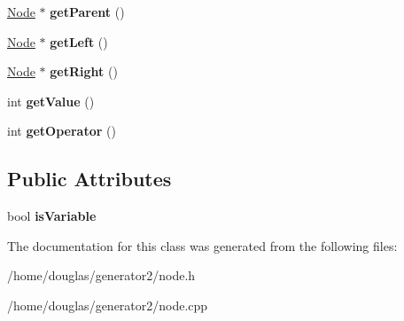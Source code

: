 \begin{DoxyCompactItemize}
\item 
\hyperlink{classNode}{Node} $\ast$ {\bfseries get\+Parent} ()\hypertarget{classNode_a220a8d64cb0df1cce083ed38c1260615}{}\label{classNode_a220a8d64cb0df1cce083ed38c1260615}

\item 
\hyperlink{classNode}{Node} $\ast$ {\bfseries get\+Left} ()\hypertarget{classNode_ac73b72f9a1fbdb23cc5c031afaccb415}{}\label{classNode_ac73b72f9a1fbdb23cc5c031afaccb415}

\item 
\hyperlink{classNode}{Node} $\ast$ {\bfseries get\+Right} ()\hypertarget{classNode_a47f547ea1e8703057e6d345f238104d1}{}\label{classNode_a47f547ea1e8703057e6d345f238104d1}

\item 
int {\bfseries get\+Value} ()\hypertarget{classNode_affbe7f986fd7ed645c5bc361363e96ec}{}\label{classNode_affbe7f986fd7ed645c5bc361363e96ec}

\item 
int {\bfseries get\+Operator} ()\hypertarget{classNode_a705ad4b608cfd4d03d0127021979517b}{}\label{classNode_a705ad4b608cfd4d03d0127021979517b}

\end{DoxyCompactItemize}
\subsection*{Public Attributes}
\begin{DoxyCompactItemize}
\item 
bool {\bfseries is\+Variable}\hypertarget{classNode_a2ef8b6435d78a530427cb1b19e72971f}{}\label{classNode_a2ef8b6435d78a530427cb1b19e72971f}

\end{DoxyCompactItemize}


The documentation for this class was generated from the following files\+:\begin{DoxyCompactItemize}
\item 
/home/douglas/generator2/node.\+h\item 
/home/douglas/generator2/node.\+cpp\end{DoxyCompactItemize}
